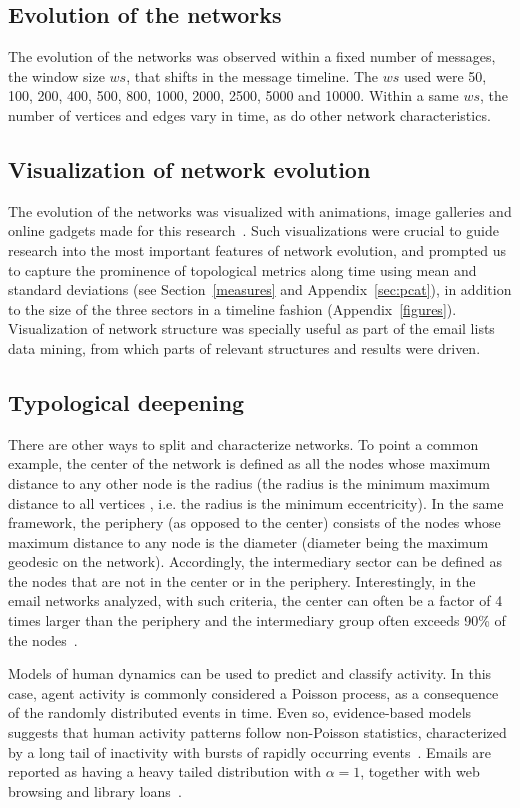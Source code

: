 \documentclass[%
 aip,
 jmp,%
 amsmath,amssymb,
 reprint,%
]{revtex4-1}
\begin{document}
   \subsection{Evolution of the networks}
The evolution of the networks was observed within a fixed number of messages, the window size $ws$, that shifts in the message timeline.
The $ws$ used were 50, 100, 200, 400, 500, 800, 1000, 2000, 2500, 5000 and 10000. Within a same $ws$, the number of vertices and edges vary in time, as do other network characteristics. 

        \subsection{Visualization of network evolution}
The evolution of the networks was visualized with animations, image galleries and online gadgets made for this research~\cite{animacoes,galGMANE,appGMANE}. Such visualizations were crucial to guide research into the most important features of network evolution, and prompted us to capture the prominence of topological metrics along time using mean and standard deviations (see Section~\ref{measures} and Appendix~\ref{sec:pcat}), in addition to the size of the three sectors in a timeline fashion (Appendix~\ref{figures}). Visualization of network structure was specially useful as part of the email lists data mining, from which parts of relevant structures and results were driven.


    \subsection{Typological deepening}
There are other ways to split and characterize networks. To point a common example, the center of the network is defined as all the nodes whose maximum distance to any other node is the radius (the radius is the minimum maximum distance to all vertices , i.e. the radius is the minimum eccentricity). 
In the same framework, the periphery (as opposed to the center) consists of the nodes whose maximum distance to any node is the diameter (diameter being the maximum geodesic on the network). Accordingly, the intermediary sector can be defined as the nodes that are not in the center or in the periphery. Interestingly, in the email networks analyzed, with such criteria, the center can often be a factor of 4 times larger than the periphery and the intermediary group often exceeds 90\% of the nodes~\cite{networkx}.

Models of human dynamics can be used to predict and classify activity. In this case, agent activity is commonly considered a Poisson process, as a consequence of the randomly distributed events in time. Even so, evidence-based models suggests that human activity patterns follow non-Poisson statistics, characterized by a long tail of inactivity with bursts of rapidly occurring events~\cite{barabasiHumanDyn,barabasiPhone}. Emails are reported as having a heavy tailed distribution with $\alpha=1$, together with web browsing and library loans~\cite{barabasiHumanDyn}.
\end{document}
